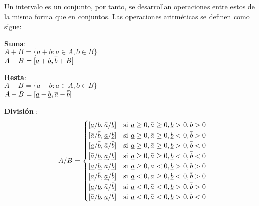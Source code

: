 Un intervalo es un conjunto, por tanto, se desarrollan operaciones entre estos de la misma forma que en conjuntos. Las operaciones aritméticas se definen como sigue:

\begin{flushleft}
\textbf{Suma}:
\\
$A + B = \{a + b : a \in A, b \in B \}$ \\
$A + B =[\uline a + \uline b, \overline{b} +\overline{B} ]$ \\

\end{flushleft}

\begin{flushleft}

\textbf{Resta}:
\\
$A - B = \{ a - b : a \in A, b \in B \}$ \\
$A - B =[\uline a - \uline b, \overline{a} -\overline{b} ]$ \\

\end{flushleft}

\begin{flushleft}

    \textbf{División }: \\
    
        \[
        A / B =
        \begin{cases}
        [\uline{a}/\bar{b}, \bar{a}/\uline{b}] & \text{si } \uline{a} \geq 0, \bar{a} \geq 0, \uline{b} > 0, \bar{b} > 0 \\
        [\bar{a}/\bar{b}, \uline{a}/\uline{b}] & \text{si } \uline{a} \geq 0, \bar{a} \geq 0, \uline{b} < 0, \bar{b} > 0 \\
        [\uline{a}/\bar{b}, \bar{a}/\bar{b}] & \text{si } \uline{a} \geq 0, \bar{a} \geq 0,   \uline{b} > 0, \bar{b} < 0 \\
        [\bar{a}/\uline{b}, \uline{a}/\uline{b}] & \text{si } \uline{a} \geq 0, \bar{a} \geq 0, \uline{b} < 0, \bar{b} < 0 \\
        [\uline{a}/\uline{b}, \bar{a}/\uline{b}] & \text{si } \uline{a} \geq 0, \bar{a} < 0, \uline{b} > 0, \bar{b} > 0 \\
    
        [\bar{a}/\bar{b}, \uline{a}/\bar{b}] & \text{si } \uline{a} < 0, \bar{a} \geq 0, \uline{b} < 0, \bar{b} > 0 \\
    
        [\uline{a}/\uline{b}, \bar{a}/\bar{b}] & \text{si } \uline{a} < 0, \bar{a} < 0, \uline{b} > 0, \bar{b} > 0 \\
        [\bar{a}/\uline{b}, \uline{a}/\bar{b}] & \text{si } \uline{a} < 0, \bar{a} < 0, \uline{b} > 0, \bar{b} < 0 \\
        \end{cases}
        \]
    
\end{flushleft}


